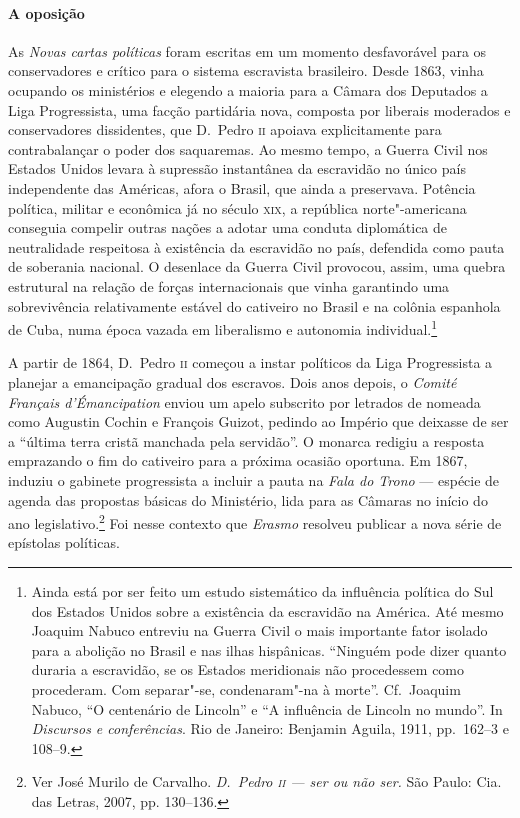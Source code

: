 \paragraph{A oposição}
As \textit{Novas cartas políticas} foram escritas em um momento
desfavorável para os conservadores e crítico para o sistema escravista
brasileiro. Desde 1863, vinha ocupando os ministérios e elegendo a maioria 
para a Câmara dos Deputados a Liga Progressista, uma facção partidária nova, 
composta por liberais moderados e conservadores dissidentes, que D.~Pedro \textsc{ii} 
apoiava explicitamente para contrabalançar o poder dos saquaremas.
Ao mesmo tempo, a Guerra Civil
nos Estados Unidos levara à  supressão instantânea da escravidão no
único país independente das Américas, afora o Brasil, que ainda a
preservava. Potência política, militar e econômica já no século \textsc{xix}, a
república norte"-americana conseguia compelir outras nações a adotar
uma conduta \mbox{diplomática} de neutralidade respeitosa à  existência da
escravidão no país, defendida como pauta de soberania nacional. O
desenlace da Guerra Civil provocou, assim, uma quebra estrutural na
relação de forças internacionais que vinha garantindo uma sobrevivência
relativamente estável do cativeiro no Brasil e na colônia espanhola de
Cuba, numa época vazada em liberalismo e autonomia
individual.\footnote{ Ainda está por ser feito um estudo sistemático da
influência política do Sul dos Estados Unidos sobre a existência da
escravidão na América. Até mesmo Joaquim Nabuco entreviu na Guerra
Civil o mais importante fator isolado para a abolição no Brasil e nas
ilhas hispânicas. ``Ninguém pode dizer quanto duraria a escravidão, se
os Estados meridionais não procedessem como procederam. Com
separar"-se, condenaram"-na à  morte''. Cf.~Joaquim Nabuco, ``O
centenário de Lincoln'' e ``A influência de Lincoln no mundo''. In
\textit{Discursos e conferências}. Rio de Janeiro: Benjamin
Aguila, 1911, pp.~162--3 e 108--9.} 

A partir de 1864, D.~Pedro \textsc{ii} começou a instar políticos da Liga
Progressista a planejar a emancipação gradual dos escravos. Dois anos
depois, o \textit{Comité Français d'Émancipation} enviou um apelo
subscrito por letrados de nomeada como Augustin Cochin e François
Guizot, pedindo ao Império que deixasse de ser a ``última terra cristã
manchada pela servidão''. O monarca redigiu a resposta emprazando o fim
do cativeiro para a próxima ocasião oportuna. Em 1867, induziu o
gabinete progressista a incluir a pauta na \textit{Fala do Trono} ---
espécie de agenda das propostas básicas do Ministério, lida para as
Câmaras no início do ano legislativo.\footnote{ Ver José Murilo de Carvalho. 
\textit{D.~Pedro \textsc{ii} --- ser ou não ser.} São Paulo: Cia. das Letras, 2007, pp. 130--136.} Foi
nesse contexto que \textit{Erasmo} resolveu publicar a nova série de epístolas políticas. 

